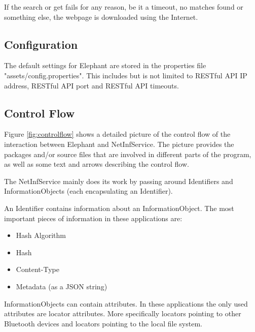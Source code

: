 If the search or get fails for any reason, be it a timeout, no matches found or something else, the webpage is downloaded using the Internet.

\subsection{Configuration}

The default settings for Elephant are stored in the properties file "assets/config.properties". This includes but is not limited to RESTful API IP address, RESTful API port and RESTful API timeouts.

\subsection{Control Flow}
\label{sec:Control Flow}

Figure \ref{fig:controlflow} shows a detailed picture of the control flow of the interaction between Elephant and NetInfService. The picture provides the packages and/or source files that are involved in different parts of the program, as well as some text and arrows describing the control flow.

The NetInfService mainly does its work by passing around Identifiers and InformationObjects (each encapsulating an Identifier).

An Identifier contains information about an InformationObject. The most important pieces of information in these applications are:
\begin{itemize}
\item Hash Algorithm
\item Hash
\item Content-Type
\item Metadata (as a JSON string)
\end{itemize}

InformationObjects can contain attributes. In these applications the only used attributes are locator attributes. More specifically locators pointing to other Bluetooth devices and locators pointing to the local file system.

